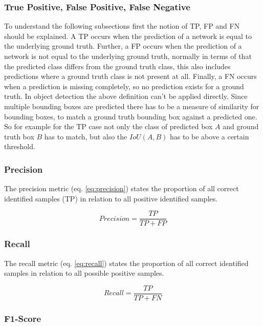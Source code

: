 \subsubsection{True Positive, False Positive, False Negative}

To understand the following subsections first the notion of \ac{TP}, \ac{FP} and \ac{FN} should be explained.
A \ac{TP} occurs when the prediction of a network is equal to the underlying ground truth.
Further, a \ac{FP} occurs when the prediction of a network is not equal to the underlying ground truth, normally in terms of that the predicted class differs from the ground truth class, this also includes predictions where a ground truth class is not present at all.
Finally, a \ac{FN} occurs when a prediction is missing completely, so no prediction exists for a ground truth.
In object detection the above definition can't be applied directly.
Since multiple bounding boxes are predicted there has to be a measure of similarity for bounding boxes, to match a ground truth bounding box against a predicted one.
So for example for the \ac{TP} case not only the class of predicted box $A$ and ground truth box $B$ has to match, but also the $IoU(A, B)$ has to be above a certain threshold.

\subsubsection{Precision}

The precision metric (eq. \ref{eq:precision}) states the proportion of all correct identified samples (\ac{TP}) in relation to all positive identified samples.

\begin{equation}
    Precision = \frac{TP}{TP + FP}
    \label{eq:precision}
\end{equation}

\subsubsection{Recall}

The recall metric (eq. \ref{eq:recall}) states the proportion of all correct identified samples in relation to all possible positive samples.

\begin{equation}
    Recall = \frac{TP}{TP + FN}
    \label{eq:recall}
\end{equation}

\subsubsection{F1-Score}

